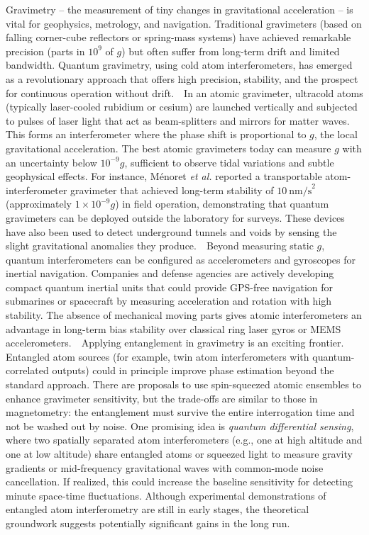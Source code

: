 \documentclass[12pt]{article}
\begin{document}
Gravimetry – the measurement of tiny changes in gravitational
acceleration – is vital for geophysics, metrology, and
navigation. Traditional gravimeters (based on falling corner-cube
reflectors or spring-mass systems) have achieved remarkable precision
(parts in $10^9$ of $g$) but often suffer from long-term drift and
limited bandwidth. Quantum gravimetry, using cold atom
interferometers, has emerged as a revolutionary approach that offers
high precision, stability, and the prospect for continuous operation
without drift.    In an atomic gravimeter, ultracold atoms (typically
laser-cooled rubidium or cesium) are launched vertically and subjected
to pulses of laser light that act as beam-splitters and mirrors for
matter waves. This forms an interferometer where the phase shift is
proportional to $g$, the local gravitational acceleration. The best
atomic gravimeters today can measure $g$ with an uncertainty below
$10^{-9}g$, sufficient to observe tidal variations and subtle
geophysical effects. For instance, Ménoret \textit{et al.} reported a
transportable atom-interferometer gravimeter that achieved long-term
stability of $10~\text{nm/s}^2$ (approximately $1 \times 10^{-9}g$) in
field operation\cite{Menoret2018}, demonstrating that quantum
gravimeters can be deployed outside the laboratory for surveys. These
devices have also been used to detect underground tunnels and voids by
sensing the slight gravitational anomalies they produce.    Beyond
measuring static $g$, quantum interferometers can be configured as
accelerometers and gyroscopes for inertial navigation. Companies and
defense agencies are actively developing compact quantum inertial
units that could provide GPS-free navigation for submarines or
spacecraft by measuring acceleration and rotation with high
stability. The absence of mechanical moving parts gives atomic
interferometers an advantage in long-term bias stability over
classical ring laser gyros or MEMS accelerometers.    Applying
entanglement in gravimetry is an exciting frontier. Entangled atom
sources (for example, twin atom interferometers with
quantum-correlated outputs) could in principle improve phase
estimation beyond the standard approach. There are proposals to use
spin-squeezed atomic ensembles to enhance gravimeter sensitivity, but
the trade-offs are similar to those in magnetometry: the entanglement
must survive the entire interrogation time and not be washed out by
noise. One promising idea is \textit{quantum differential sensing},
where two spatially separated atom interferometers (e.g., one at high
altitude and one at low altitude) share entangled atoms or squeezed
light to measure gravity gradients or mid-frequency gravitational
waves with common-mode noise cancellation. If realized, this could
increase the baseline sensitivity for detecting minute space-time
fluctuations. Although experimental demonstrations of entangled atom
interferometry are still in early stages, the theoretical groundwork
suggests potentially significant gains in the long run.   
\end{document}
